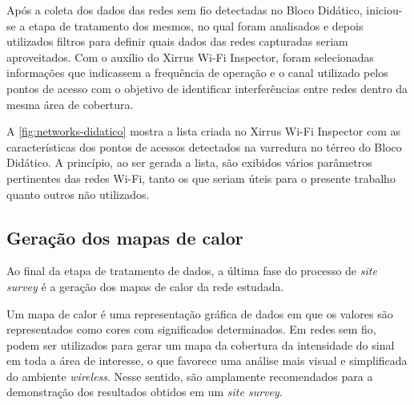 Após a coleta dos dados das redes sem fio detectadas no Bloco Didático, iniciou-se a etapa de tratamento dos mesmos, no qual foram analisados e depois utilizados filtros para definir quais dados das redes capturadas seriam aproveitados. Com o auxílio do Xirrus Wi-Fi Inspector, foram selecionadas informações que indicassem a frequência de operação e o canal utilizado pelos pontos de acesso com o objetivo de identificar interferências entre redes dentro da mesma área de cobertura.

A \autoref{fig:networks-didatico} mostra a lista criada no Xirrus Wi-Fi Inspector com as características dos pontos de acessos detectados na varredura no térreo do Bloco Didático. A princípio, ao ser gerada a lista, são exibidos vários parâmetros pertinentes das redes Wi-Fi, tanto os que seriam úteis para o presente trabalho quanto outros não utilizados.

\begin{figure}[H]
	\centering
\end{figure}

\subsection{Geração dos mapas de calor}
\label{subsec:mapas-de-calor}

Ao final da etapa de tratamento de dados, a última fase do processo de \textit{site survey} é a geração dos mapas de calor da rede estudada.

Um mapa de calor é uma representação gráfica de dados em que os valores são representados como cores com significados determinados. Em redes sem fio, podem ser utilizados para gerar um mapa da cobertura da intensidade do sinal em toda a área de interesse, o que favorece uma análise mais visual e simplificada do ambiente \textit{wireless}. Nesse sentido, são amplamente recomendados para a demonstração dos resultados obtidos em um \textit{site survey}.

